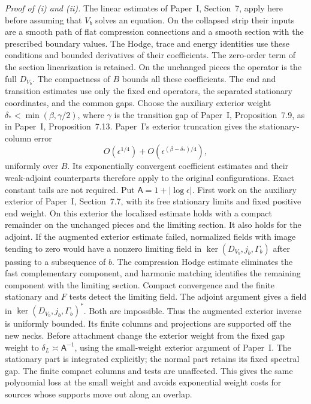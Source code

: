 \documentclass[11pt]{amsart}
\theoremstyle{definition}
\theoremstyle{remark}
\theoremstyle{plain}
\numberwithin{equation}{section}
\begin{document}
\emph{Proof of (i) and (ii).} The linear estimates of
Paper~I, Section~7, apply here before assuming that $V_b$ solves
an equation. On the collapsed strip their inputs are a smooth
path of flat compression connections and a smooth section with
the prescribed boundary values. The Hodge, trace and energy
identities use these conditions and bounded derivatives of their
coefficients. The zero-order term of the section linearization
is retained. On the unchanged pieces the operator is the full
$D_{V_b}$. The compactness of $B$ bounds all these coefficients.
The end and transition estimates use only the fixed end operators,
the separated stationary coordinates, and the common gaps. Choose
the auxiliary exterior weight $\delta_*<\min(\beta,\gamma/2)$, where
$\gamma$ is the transition gap of Paper~I, Proposition~7.9, as in
Paper~I, Proposition~7.13. Paper~I's exterior
truncation gives the stationary-column error
\[
 O(\epsilon^{1/4})+
 O(\epsilon^{(\beta-\delta_*)/4}),
\]
uniformly over $B$. Its exponentially convergent coefficient
estimates and their weak-adjoint counterparts therefore apply to
the original configurations. Exact constant tails are not required.
Put $\mathsf A=1+|\log\epsilon|$. First work on the auxiliary
exterior of Paper~I, Section~7.7,
with its free stationary limits and fixed positive end weight.
On this exterior the localized estimate holds with a compact
remainder on the unchanged pieces and the limiting section.
It also holds for the adjoint. If the augmented exterior estimate
failed, normalized fields with image tending to zero would have
a nonzero limiting field in $\ker(D_{V_b},j_b,\Gamma_b)$ after
passing to a subsequence of $b$. The compression Hodge estimate
eliminates the fast complementary component, and harmonic matching
identifies the remaining component with the limiting section.
Compact convergence and the finite stationary and $F$ tests detect
the limiting field. The adjoint argument gives a field in
$\ker(D_{V_b},j_b,\Gamma_b)^*$. Both are impossible. Thus the
augmented exterior inverse is uniformly bounded. Its finite
columns and projections are supported off the new necks. Before
attachment change the exterior weight from the fixed gap weight
to $\delta_L\asymp\mathsf A^{-1}$, using the small-weight exterior
argument of Paper~I. The stationary part is integrated explicitly;
the normal part retains its fixed spectral gap. The finite compact
columns and tests are unaffected. This gives the same polynomial
loss at the small weight and avoids exponential weight costs for
sources whose supports move out along an overlap.
\end{document}
